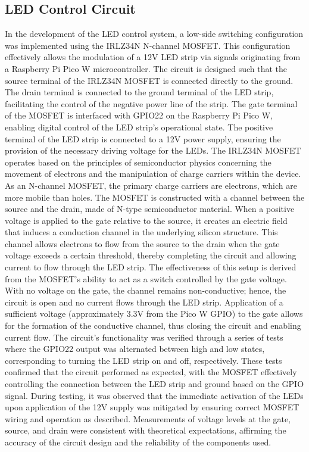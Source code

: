 \documentclass[12pt]{article} %
\begin{document}
\subsection{LED Control Circuit}
\noindent In the development of the LED control system, a low-side switching configuration was implemented using the IRLZ34N N-channel MOSFET. This configuration effectively allows the modulation of a 12V LED strip via signals originating from a Raspberry Pi Pico W microcontroller. The circuit is designed such that the source terminal of the IRLZ34N MOSFET is connected directly to the ground. The drain terminal is connected to the ground terminal of the LED strip, facilitating the control of the negative power line of the strip. The gate terminal of the MOSFET is interfaced with GPIO22 on the Raspberry Pi Pico W, enabling digital control of the LED strip’s operational state. The positive terminal of the LED strip is connected to a 12V power supply, ensuring the provision of the necessary driving voltage for the LEDs.
\newline
\newline
\noindent The IRLZ34N MOSFET \cite{ref_mosfet} operates based on the principles of semiconductor physics concerning the movement of electrons and the manipulation of charge carriers within the device. As an N-channel MOSFET, the primary charge carriers are electrons, which are more mobile than holes. The MOSFET is constructed with a channel between the source and the drain, made of N-type semiconductor material. When a positive voltage is applied to the gate relative to the source, it creates an electric field that induces a conduction channel in the underlying silicon structure. This channel allows electrons to flow from the source to the drain when the gate voltage exceeds a certain threshold, thereby completing the circuit and allowing current to flow through the LED strip.
\newline
\newline
\noindent The effectiveness of this setup is derived from the MOSFET's ability to act as a switch controlled by the gate voltage. With no voltage on the gate, the channel remains non-conductive; hence, the circuit is open and no current flows through the LED strip. Application of a sufficient voltage (approximately 3.3V from the Pico W GPIO) to the gate allows for the formation of the conductive channel, thus closing the circuit and enabling current flow.
\newline
\newline
The circuit's functionality was verified through a series of tests where the GPIO22 output was alternated between high and low states, corresponding to turning the LED strip on and off, respectively. These tests confirmed that the circuit performed as expected, with the MOSFET effectively controlling the connection between the LED strip and ground based on the GPIO signal. During testing, it was observed that the immediate activation of the LEDs upon application of the 12V supply was mitigated by ensuring correct MOSFET wiring and operation as described. Measurements of voltage levels at the gate, source, and drain were consistent with theoretical expectations, affirming the accuracy of the circuit design and the reliability of the components used.
\end{document}
